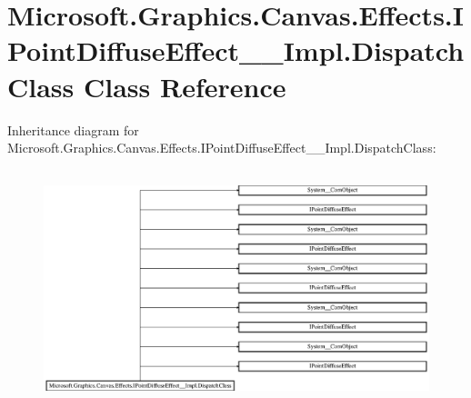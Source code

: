 \hypertarget{class_microsoft_1_1_graphics_1_1_canvas_1_1_effects_1_1_i_point_diffuse_effect_____impl_1_1_dispatch_class}{}\section{Microsoft.\+Graphics.\+Canvas.\+Effects.\+I\+Point\+Diffuse\+Effect\+\_\+\+\_\+\+Impl.\+Dispatch\+Class Class Reference}
\label{class_microsoft_1_1_graphics_1_1_canvas_1_1_effects_1_1_i_point_diffuse_effect_____impl_1_1_dispatch_class}
Inheritance diagram for Microsoft.\+Graphics.\+Canvas.\+Effects.\+I\+Point\+Diffuse\+Effect\+\_\+\+\_\+\+Impl.\+Dispatch\+Class\+:\begin{figure}[H]
\begin{center}
\leavevmode
\includegraphics[height=6.905830cm]{class_microsoft_1_1_graphics_1_1_canvas_1_1_effects_1_1_i_point_diffuse_effect_____impl_1_1_dispatch_class}
\end{center}
\end{figure}
